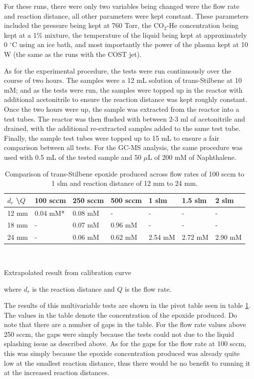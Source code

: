 For these runs, there were only two variables being changed were the flow rate and reaction distance, all other parameters were kept constant. These parameters included the pressure being kept at 760 Torr, the CO$_2$-He concentration being kept at a 1\% mixture, the temperature of the liquid being kept at approximately 0 $^{\circ}$C using an ice bath, and most importantly the power of the plasma kept at 10 W (the same as the runs with the COST jet). 

As for the experimental procedure, the tests were run continuously over the course of two hours. The samples were a 12 mL solution of trans-Stilbene at 10 mM; and as the tests were run, the samples were topped up in the reactor with additional acetonitrile to ensure the reaction distance was kept roughly constant. Once the two hours were up, the sample was extracted from the reactor into a test tubes. The reactor was then flushed with between 2-3 ml of acetonitrile and drained, with the additional re-extracted samples added to the same test tube. Finally, the sample test tubes were topped up to 15 mL to ensure a fair comparison between all tests. For the GC-MS analysis, the same procedure was used with 0.5 mL of the tested sample and 50 $\mu$L of 200 mM of Naphthalene.

\begin{table}[h!]
\centering
\caption{Comparison of trans-Stilbene epoxide produced across flow rates of 100 sccm to 1 slm and reaction distance of 12 mm to 24 mm.}
\label{tb:pivot_table_flow_rate_reaction_distance}
\begin{tabular}{lllllll}
$d_r$ \textbackslash $Q$ & 100 sccm & 250 sccm & 500 sccm & 1 slm & 1.5 slm & 2 slm\\
\hline 
12 mm & 0.04 mM* & 0.08 mM & -       & -       & -       & -       \\
18 mm & -        & 0.07 mM & 0.96 mM & -       & -       & -       \\
24 mm & -        & 0.06 mM & 0.62 mM & 2.54 mM & 2.72 mM & 2.90 mM
\end{tabular} 
\\
{\raggedright *Extrapolated result from calibration curve \par}
\end{table}
where $d_r$ is the reaction distance and $Q$ is the flow rate. 

The results of this multivariable tests are shown in the pivot table seen in table \ref{tb:pivot_table_flow_rate_reaction_distance}. The values in the table denote the concentration of the epoxide produced. Do note that there are a number of gaps in the table. For the flow rate values above 250 sccm, the gaps were simply because the tests could not due to the liquid splashing issue as described above. As for the gaps for the flow rate at 100 sccm, this was simply because the epoxide concentration produced was already quite low at the smallest reaction distance, thus there would be no benefit to running it at the increased reaction distances. 


